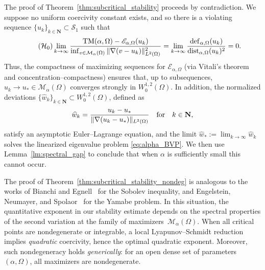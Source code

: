 \documentclass[reqno,11pt]{amsart}
\theoremstyle{definition}
\begin{document}
The proof of Theorem~\ref{thm:subcritical_stability} 
proceeds by contradiction. We suppose no uniform coercivity constant 
exists, and so there is a violating sequence $\{ u_k\}_{k \in \mathbf{N}} \subset 
\mathcal{S}_1$ such that 
\begin{equation}\label{contra0}\tag{$\mathcal{H}_0$}
			\lim_{k\rightarrow \infty}\frac{ {\rm TM}(\alpha,\Omega) - 
            \mathscr{E}_{\alpha,\Omega}(u_k)}{\inf_{v \in \mathcal{M}_\alpha(\Omega)} 
            \|{\nabla (v-u_k)}\|_{L^2(\Omega)}^2}=\lim_{k\to\infty}
            \frac{{\rm def}_{\alpha,\Omega}(u_k)}{{\rm dist}_{\alpha,\Omega}(u_k)^2}=0.
	\end{equation}
Thus, the compactness of maximizing sequences for $\mathscr{E}_{\alpha,\Omega}$ (via Vitali’s 
theorem and concentration--compactness) ensures that, up to subsequences, 
$u_k\to u_*\in\mathcal{M}_\alpha(\Omega)$ converges strongly in $W^{1,2}_0(\Omega)$. 
In addition, the normalized deviations $\{\widehat{w}_k\}_{k\in\mathbf{N}}
\subset W^{1,2}_0(\Omega)$, defined as
\begin{equation}\label{eq:normalized_deviations}
\widehat{w}_k=\frac{u_k-u_*}{\|\nabla(u_k-u_*)\|_{L^2(\Omega)}} \quad {\rm for} \quad k\in\mathbf{N},
\end{equation}
satisfy an asymptotic Euler--Lagrange equation, and the limit 
$\widehat{w}_*:=\lim_{k\to\infty}\widehat{w}_k$ solves the linearized eigenvalue 
problem \eqref{eq:alpha_BVP}. We then use Lemma~\ref{lm:spectral_gap} to 
conclude that when $\alpha$ is sufficiently small this cannot occur. 

The proof of Theorem~\ref{thm:subcritical_stability_nondeg} is analogous to the works of 
Bianchi and Egnell~\cite{BE} for the Sobolev inequality, 
and Engelstein, Neumayer, and Spolaor~\cite{MR4427104} for the Yamabe problem. 
In this situation, the quantitative exponent in our stability estimate depends on the spectral properties 
of the second variation at the family of maximizers~$\mathcal{M}_\alpha(\Omega)$.
When all critical points are nondegenerate or integrable, a local Lyapunov--Schmidt reduction 
implies \emph{quadratic} coercivity, hence the optimal quadratic exponent.
Moreover, such nondegeneracy holds \emph{generically}: for an open dense set of parameters 
$(\alpha,\Omega)$, all maximizers are nondegenerate.
\end{document}
